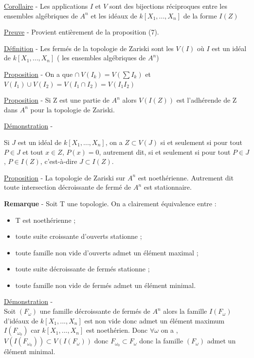 \documentclass[10pt, twoside]{article}
\theoremstyle{plain}
\theoremstyle{definition}
\theoremstyle{plain}
\theoremstyle{plain}
\theoremstyle{definition}
\theoremstyle{remark}
\begin{document}
\underline{Corollaire} - Les applications $I$ et $V$ sont des bijections réciproques entre les ensembles algébriques de $ A^{n}$ et les idéaux de $k[X_{1},...,X_{n}]$ de la forme $I(Z)$

\underline{Preuve} - Provient entièrement de la proposition (7). 

\underline{Définition} - Les fermés de la topologie de Zariski sont les $V(I)$ où $I$ est un idéal de $k[X_{1},...,X_{n}]$ ( les ensembles algébriques de $A^{n}$)

\underline{Proposition} - 
On a que $ \cap \ V(I_{k}) = V(\sum I_{k}) $ et $V(I_1 ) \cup V( I_2) = V(I_1 \cap I_2) = V(I_1 I_2) $

\underline{Proposition} - Si Z est une partie de $A^{n}$ alors $V(I(Z)) $ est l'adhérende de Z dans $A^n$ pour la topologie de Zariski.

\underline{Démonstration} - 

Si $J$ est un idéal de $k[X_1, . . . , X_n]$, on a $Z \subset V (J)$ si et
seulement si pour tout $ P \in J$ et tout $x \in Z$, $P(x) = 0$, autrement dit, si
et seulement si pour tout $P \in J$, $P \in I(Z)$, c’est-à-dire $J \subset I (Z)$.

\underline{Proposition} - La topologie de Zariski sur $A^n$ est noethérienne. Autrement dit toute intersection décroissante  de fermé de $A^n$ est stationnaire.



\textbf{Remarque} -  Soit T une topologie. On a clairement équivalence entre :

\begin{itemize}
    \item T est noethérienne ;
    \item toute suite croissante d'ouverts stationne ;
    \item toute famille non vide d'ouverts admet un élément maximal ;
    \item toute suite décroissante de fermés stationne ;
    \item toute famille non vide de fermés admet un élément minimal.
\end{itemize}

\underline{Démonstration} - 
\\ Soit $(F_\omega) $ une famille décroissante de fermés de $A^n$ alors la famille $I(F_\omega)$ d'idéaux de $k[X_{1},...,X_{n}]$ est non vide donc admet un élément maximum $I(F_{\omega_{0}})$ car $k[X_{1},...,X_{n}]$ est noethérien. Donc $\forall \omega $ on a , $V(I(F_{\omega_{0}})) \subset V(I(F_\omega))$ donc $F_{\omega_{0}} \subset F_{\omega}$ donc la famille $(F_\omega) $ admet un élément minimal.
\end{document}
